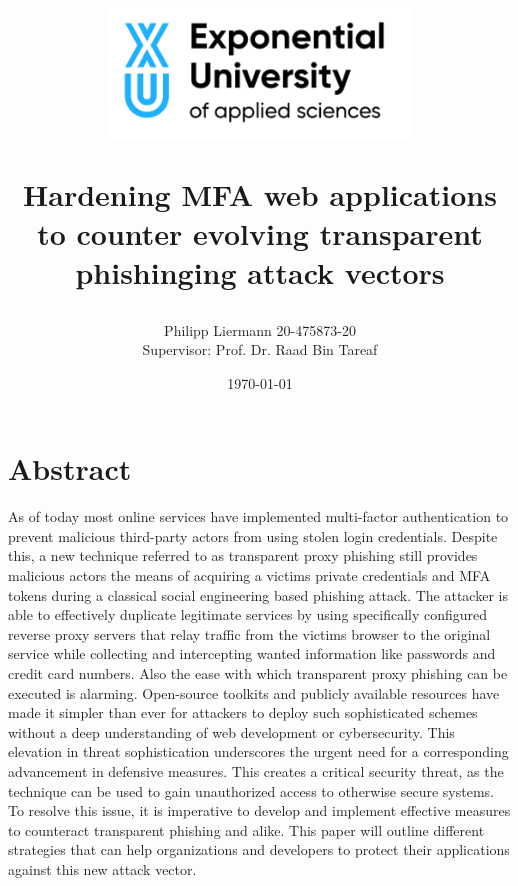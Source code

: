 \documentclass[12pt]{scrbook}
\begin{document}
\author{Philipp Liermann 20-475873-20\\Supervisor: Prof. Dr. Raad Bin Tareaf}
\date{\today}

\title{ \begin{center} \includegraphics[width=8cm]{./images/logo.png}
  \end{center} \vspace{2cm} Hardening MFA web applications to counter evolving
transparent phishinging attack vectors \vspace{2cm} \large }

\maketitle

\newpage \tableofcontents

\newpage
\section{Abstract}
As of today most online services have implemented
multi-factor authentication to prevent malicious third-party actors from using stolen login credentials.
Despite this, a new technique referred to as transparent proxy phishing still provides
malicious actors the means of acquiring a victims private credentials and MFA tokens during a classical
social engineering based phishing attack. The attacker is able to effectively duplicate legitimate services
by using specifically configured reverse proxy servers that relay traffic from the victims browser to the original service
while collecting and intercepting wanted information like passwords and credit card numbers.
Also the ease with which transparent proxy phishing can be executed is alarming. Open-source toolkits and publicly available resources have made it simpler than ever for attackers to deploy such sophisticated schemes without a deep understanding of web development or cybersecurity. This elevation in threat sophistication underscores the urgent need for a corresponding advancement in defensive measures.
This creates a critical security threat, as the technique can be used to gain unauthorized access to
otherwise secure systems. 
To resolve this issue, it is imperative to develop
and implement effective measures to counteract transparent phishing and alike.
This paper will outline different strategies that can help organizations and
developers to protect their applications against this new attack vector.
\end{document}
